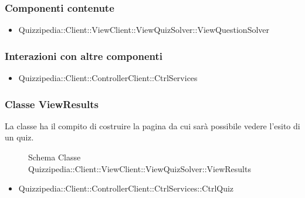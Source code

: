 \subsubsection{Componenti contenute}
\begin{itemize}
\item Quizzipedia::Client::ViewClient::ViewQuizSolver::ViewQuestionSolver
\end{itemize}
\subsubsection{Interazioni con altre componenti}
\begin{itemize}
\item Quizzipedia::Client::ControllerClient::CtrlServices
\end{itemize}
\subsubsection{Classe ViewResults}
La classe ha il compito di costruire la pagina da cui sarà possibile vedere l'esito di un quiz.
\begin{figure}[H]
\centering
\noindent{}
\caption{Schema Classe Quizzipedia::Client::ViewClient::ViewQuizSolver::ViewResults}
\end{figure}
\begin{itemize}
\item Quizzipedia::Client::ControllerClient::CtrlServices::CtrlQuiz
\end{itemize}
